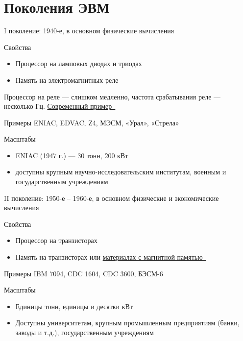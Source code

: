 \documentclass[xetex,aspectratio=43]{beamer}
\begin{document}
\section{Поколения ЭВМ}

\begin{frame}{I поколение: 1940-е, в основном физические вычисления}
	
	\begin{block}{Свойства}
		\begin{itemize}
			\item
			Процессор на ламповых диодах и триодах
			\item
			Память на электромагнитных реле
		\end{itemize}
		
		Процессор на реле --- слишком медленно, частота срабатывания реле ---
		несколько Гц. \href{https://youtu.be/5hhbGBlP3_4}{Современный пример~\extlink}
	\end{block}
	
	\begin{block}{Примеры}
		ENIAC, EDVAC, Z4, МЭСМ, «Урал», «Стрела»
	\end{block}
	
	\begin{block}{Масштабы}
		\begin{itemize}
			\item
			ENIAC (1947 г.) --- 30 тонн, 200 кВт
			\item
			доступны крупным научно-исследовательским институтам, военным и
			государственным учреждениям
		\end{itemize}
	\end{block}
\end{frame}

\begin{frame}{II поколение: 1950-е -- 1960-е, в основном физические и экономические вычисления}

	\begin{block}{Свойства}
		\begin{itemize}
			\item
			Процессор на транзисторах
			\item
			Память на транзисторах или
			\href{https://en.wikipedia.org/wiki/Magnetic-core_memory}{материалах с
				магнитной памятью~\extlink}
		\end{itemize}
	\end{block}
	
	\begin{block}{Примеры}
		IBM 7094, CDC 1604, CDC 3600, БЭСМ-6
	\end{block}
	
	\begin{block}{Масштабы}
		\begin{itemize}
			\item
			Единицы тонн, единицы и десятки кВт
			\item
			Доступны университетам, крупным промышленным предприятиям (банки,
			заводы и т.д.), государственным учреждениям
		\end{itemize}
	\end{block}
\end{frame}
\end{document}
